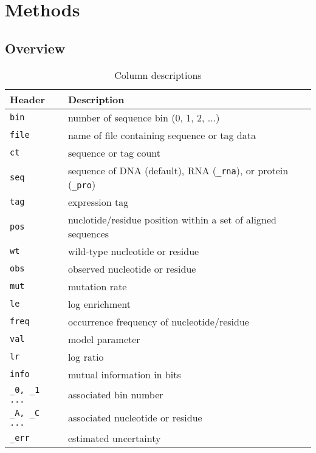 \documentclass{bmcart}
\begin{document}
\section*{Methods} %

\subsection*{Overview}


\begin{table}[h!]
\caption{Column descriptions}
\begin{tabular}{l|l}
Header &  Description \\ \hline \hline
\texttt{bin}            & number of sequence bin (0, 1, 2, ...) \\
\texttt{file}           & name of file containing sequence or tag data \\
\texttt{ct}             & sequence or tag count  \\
\texttt{seq}            & sequence of DNA  (default), RNA (\texttt{\_rna}), or protein (\texttt{\_pro}) \\
\texttt{tag}            & expression tag \\
\texttt{pos}            & nuclotide/residue position within a set of aligned sequences \\
\texttt{wt}             & wild-type nucleotide or residue \\
\texttt{obs}            & observed nucleotide or residue \\ 
\texttt{mut}            & mutation rate \\
\texttt{le}             & log enrichment \\
\texttt{freq}           & occurrence frequency of nucleotide/residue \\
\texttt{val}            & model parameter  \\
\texttt{lr}             & log ratio \\
\texttt{info}           & mutual information in bits \\ 
\texttt{\_0, \_1 ...}  & associated bin number \\
\texttt{\_A, \_C ...} & associated nucleotide or residue \\
\texttt{\_err}          & estimated uncertainty 
\end{tabular}
\end{table}

\newenvironment{myfont}{\fontfamily{\ttdefault}\selectfont}{\par}
\end{document}
